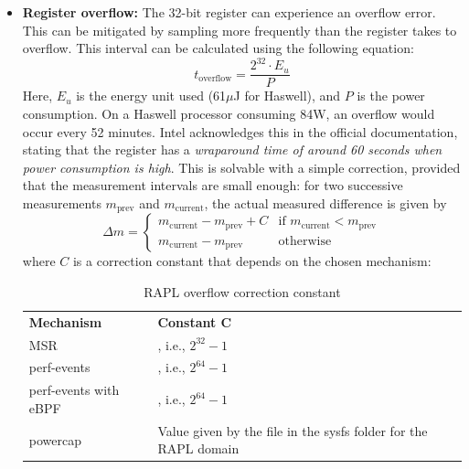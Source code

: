 \begin{itemize}
    \item \textbf{Register overflow:} The 32-bit register can experience an overflow error\parencite{khan2018rapl, raffin2024dissecting}. This can be mitigated by sampling more frequently than the register takes to overflow. This interval can be calculated using the following equation:
    \begin{equation}
        t_{\text{overflow}} = \frac{2^{32} \cdot E_u}{P}
    \end{equation}
    Here, $E_u$ is the energy unit used (61$\mu$J for Haswell), and $P$ is the power consumption. On a Haswell processor consuming 84W, an overflow would occur every 52 minutes. Intel acknowledges this in the official documentation, stating that the register has a \textit{wraparound time of around 60 seconds when power consumption is high}\parencite{intel-sdm}.
    This is solvable with a simple correction, provided that the measurement intervals are small enough: for two successive measurements $m_{\text{prev}}$ and $m_{\text{current}}$, the actual measured difference is given by
    \begin{equation}
        \Delta m =
        \begin{cases}
        m_{\text{current}} - m_{\text{prev}} + C & \text{if } m_{\text{current}} < m_{\text{prev}} \\
        m_{\text{current}} - m_{\text{prev}} & \text{otherwise}
        \end{cases}
    \end{equation}
    where $C$ is a correction constant that depends on the chosen mechanism:
    
    \begin{table}[h]
        \small
        \centering
        \begin{tabular}{ |L{4cm} | L{9cm}| }
            \hline
            \textbf{Mechanism} & \textbf{Constant C} \\
            \Xhline{1.5pt}
            MSR & , i.e., $2^{32} - 1$ \\
            \hline
            perf-events & , i.e., $2^{64} - 1$ \\
            \hline
            perf-events with eBPF & , i.e., $2^{64} - 1$ \\
            \hline
            powercap & Value given by the file  in the sysfs folder for the RAPL domain \\
            \hline
        \end{tabular}
        \caption[RAPL overflow correction constant]{RAPL overflow correction constant}
        \label{tab:RAPL_overflow_correction_constant}
    \end{table}


\end{itemize}
